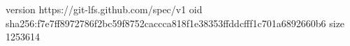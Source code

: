 version https://git-lfs.github.com/spec/v1
oid sha256:f7e7ff8972786f2bc59f8752caccca818f1e38353ffddcfff1c701a6892660b6
size 1253614
